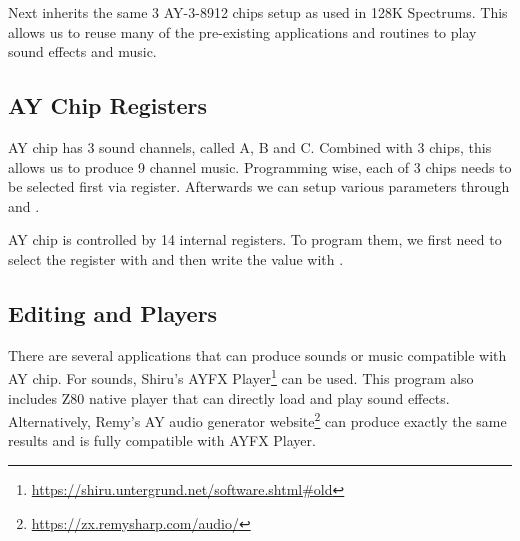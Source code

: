 \documentclass[12pt,twoside,openright,a4paper]{book}
\begin{document}

Next inherits the same 3 AY-3-8912 chips setup as used in 128K Spectrums. This allows us to reuse many of the pre-existing applications and routines to play sound effects and music.

\subsection{AY Chip Registers}

AY chip has 3 sound channels, called A, B and C. Combined with 3 chips, this allows us to produce 9 channel music. Programming wise, each of 3 chips needs to be selected first via  register. Afterwards we can setup various parameters through  and .

AY chip is controlled by 14 internal registers. To program them, we first need to select the register with  and then write the value with .


\subsection{Editing and Players}

There are several applications that can produce sounds or music compatible with AY chip. For sounds, Shiru's AYFX Player\footnote{\url{https://shiru.untergrund.net/software.shtml#old}} can be used. This program also includes Z80 native player that can directly load and play sound effects. Alternatively, Remy's AY audio generator website\footnote{\url{https://zx.remysharp.com/audio/}} can produce exactly the same results and is fully compatible with AYFX Player.
\end{document}
